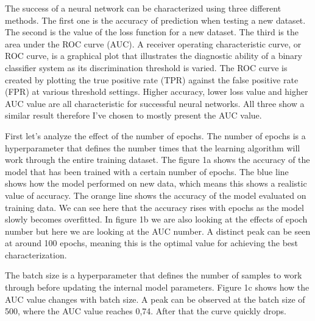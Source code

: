 \documentclass[12pt, a4paper]{article}
\begin{document}
The success of a neural network can be characterized using three different methods. The first one is the accuracy of prediction when testing a new dataset. The second is the value of the loss function for a new dataset. The third is the area under the ROC curve (AUC). A receiver operating characteristic curve, or ROC curve, is a graphical plot that illustrates the diagnostic ability of a binary classifier system as its discrimination threshold is varied. The ROC curve is created by plotting the true positive rate (TPR) against the false positive rate (FPR) at various threshold settings. Higher accuracy, lower loss value and higher AUC value are all characteristic for successful neural networks. All three show a similar result therefore I've chosen to mostly present the AUC value.

First let's analyze the effect of the number of epochs. The number of epochs is a hyperparameter that defines the number times that the learning algorithm will work through the entire training dataset. The figure 1a shows the accuracy of the model that has been trained with a certain number of epochs. The blue line shows how the model performed on new data, which means this shows a realistic value of accuracy. The orange line shows the accuracy of the model evaluated on training data. We can see here that the accuracy rises with epochs as the model slowly becomes overfitted. In figure 1b we are also looking at the effects of epoch number but here we are looking at the AUC number. A distinct peak can be seen at around 100 epochs, meaning this is the optimal value for achieving the best characterization.

The batch size is a hyperparameter that defines the number of samples to work through before updating the internal model parameters. Figure 1c shows how the AUC value changes with batch size. A peak can be observed at the batch size of 500, where the AUC value reaches 0,74. After that the curve quickly drops.
\end{document}
